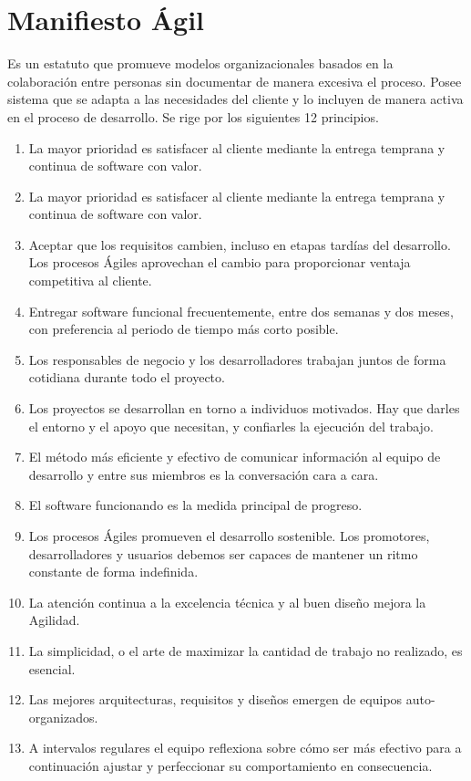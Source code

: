 \chapter{Manifiesto Ágil}

Es un estatuto que promueve modelos organizacionales basados en la colaboración entre personas sin documentar de manera excesiva el proceso. Posee sistema que se adapta a las necesidades del cliente y lo incluyen de manera activa en el proceso de desarrollo. Se rige por los siguientes 12 principios.

\begin{enumerate}
    \item La mayor prioridad es satisfacer al cliente mediante la entrega temprana y continua de software con valor.
    \item La mayor prioridad es satisfacer al cliente mediante la entrega temprana y continua de software con valor.
    \item Aceptar que los requisitos cambien, incluso en etapas tardías del desarrollo. Los procesos Ágiles  aprovechan el cambio para proporcionar ventaja competitiva al cliente.
    \item Entregar software funcional frecuentemente, entre dos semanas y dos meses, con preferencia al periodo de tiempo más corto posible.
    \item Los responsables de negocio y los desarrolladores trabajan juntos de forma cotidiana durante todo el proyecto.
    \item Los proyectos se desarrollan en torno a individuos motivados. Hay que darles el entorno y el apoyo que necesitan, y confiarles la ejecución del trabajo.
    \item El método más eficiente y efectivo de comunicar información al equipo de desarrollo y entre sus miembros es la conversación cara a cara.
    \item El software funcionando es la medida principal de progreso.
    \item Los procesos Ágiles promueven el desarrollo sostenible. Los promotores, desarrolladores y usuarios debemos ser capaces de mantener un ritmo constante de forma indefinida.
    \item La atención continua a la excelencia técnica y al buen diseño mejora la Agilidad.
    \item La simplicidad, o el arte de maximizar la cantidad de trabajo no realizado, es esencial.
    \item Las mejores arquitecturas, requisitos y diseños emergen de equipos auto-organizados.
    \item A intervalos regulares el equipo reflexiona sobre cómo ser más efectivo para a continuación ajustar y perfeccionar su comportamiento en consecuencia.
\end{enumerate}

